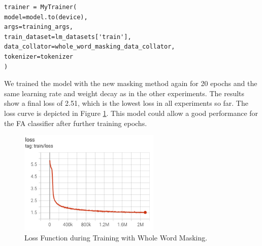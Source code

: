\begin{code}
\label{code:trainer_wwm}
\begin{verbatim}
trainer = MyTrainer(
model=model.to(device),
args=training_args,
train_dataset=lm_datasets['train'],
data_collator=whole_word_masking_data_collator,
tokenizer=tokenizer
)
\end{verbatim}
\end{code}

We trained the model with the new masking method again for 20 epochs and the same learning rate and weight decay as in the other experiments. The results show a final loss of 2.51, which is the lowest loss in all experiments so far. The loss curve is depicted in Figure \ref{fig:loss_wwm}. This model could allow a good performance for the FA classifier after further training epochs. 

\begin{figure}[H]
	\centering
	\includegraphics[width=0.6\textwidth]{figures/loss_wwm_20.png}
	\caption{Loss Function during Training with Whole Word Masking.}
	\label{fig:loss_wwm}
\end{figure}